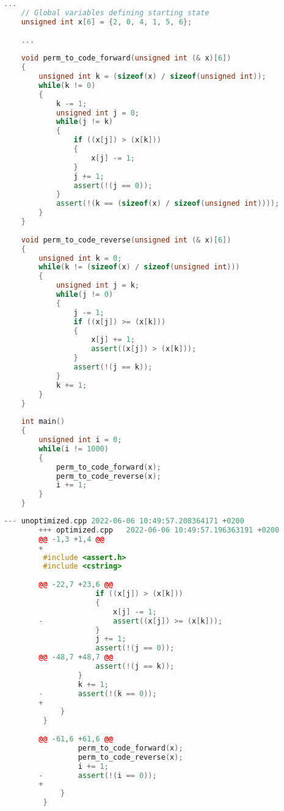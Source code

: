 \begin{varwidth}[t]{0.45\textwidth}
    \begin{lstlisting}[language=C++, label={lst:optRLE}, caption={Optimized perm to code program.}]
    ...
    // Global variables defining starting state
    unsigned int x[6] = {2, 0, 4, 1, 5, 6};
     
    ...
     
    void perm_to_code_forward(unsigned int (& x)[6])
    {
        unsigned int k = (sizeof(x) / sizeof(unsigned int));
        while(k != 0)
        {
            k -= 1;
            unsigned int j = 0;
            while(j != k)
            {
                if ((x[j]) > (x[k]))
                {
                    x[j] -= 1;
                }
                j += 1;
                assert(!(j == 0));
            }
            assert(!(k == (sizeof(x) / sizeof(unsigned int))));
        }
    }
     
    void perm_to_code_reverse(unsigned int (& x)[6])
    {
        unsigned int k = 0;
        while(k != (sizeof(x) / sizeof(unsigned int)))
        {
            unsigned int j = k;
            while(j != 0)
            {
                j -= 1;
                if ((x[j]) >= (x[k]))
                {
                    x[j] += 1;
                    assert((x[j]) > (x[k]));
                }
                assert(!(j == k));
            }
            k += 1;
        }
    }
     
    int main()
    {
        unsigned int i = 0;
        while(i != 1000)
        {
            perm_to_code_forward(x);
            perm_to_code_reverse(x);
            i += 1;
        }
    }
    \end{lstlisting}
    \end{varwidth}
    \hspace{4em}
    \begin{varwidth}[t]{0.45\textwidth}
    \begin{lstlisting}[language=C++, label={lst:RLE}, caption={Output from \texttt{diff -u} bwetween
        the optimized perm to code program vs. the unoptimized.}]
        --- unoptimized.cpp	2022-06-06 10:49:57.208364171 +0200
        +++ optimized.cpp	2022-06-06 10:49:57.196363191 +0200
        @@ -1,3 +1,4 @@
        +
         #include <assert.h>
         #include <cstring>
          
        @@ -22,7 +23,6 @@
                     if ((x[j]) > (x[k]))
                     {
                         x[j] -= 1;
        -                assert((x[j]) >= (x[k]));
                     }
                     j += 1;
                     assert(!(j == 0));
        @@ -48,7 +48,7 @@
                     assert(!(j == k));
                 }
                 k += 1;
        -        assert(!(k == 0));
        +        
             }
         }
          
        @@ -61,6 +61,6 @@
                 perm_to_code_forward(x);
                 perm_to_code_reverse(x);
                 i += 1;
        -        assert(!(i == 0));
        +        
             }
         }
        
    \end{lstlisting}
    \end{varwidth}

